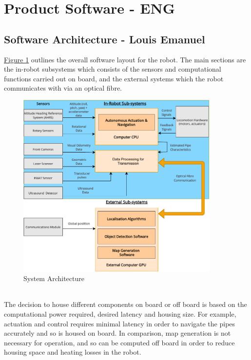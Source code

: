 \documentclass[11pt]{article}		%
\newcommand{\figref}[1]{\hyperref[#1]{Figure \ref*{#1}}}    %
\begin{document}
	\section{Product Software - ENG}
		\subsection[Software Architecture] {Software Architecture - Louis Emanuel}
        
	         \figref{overalls} outlines the overall software layout for the robot. The main sections are the in-robot subsystems which consists of the sensors and computational functions carried out on board, and the external systems which the robot communicates with via an optical fibre.
    		\begin{figure}[h]
				\centering
				\includegraphics[width = 0.9\textwidth]{subsystemss}
				\caption{System Architecture}
				\label{overalls}
			\end{figure}
			\\
	        \hspace*{3ex}The decision to house different components on board or off board is based on the computational power required, desired latency and housing size. For example, actuation and control requires minimal latency in order to navigate the pipes accurately and so is housed on board. In comparison, map generation is not necessary for operation, and so can be computed off board in order to reduce housing space and heating losses in the robot.
	        \\
\end{document}
